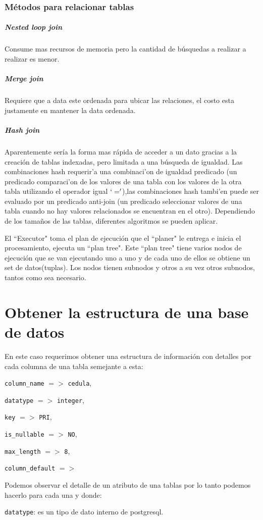 \subsubsection{M\'etodos para relacionar tablas}
\subparagraph{Nested loop join}
Consume mas recursos de memoria pero la cantidad de b\'usquedas a realizar a realizar es menor.\\
\subparagraph{Merge join}
Requiere que a data este ordenada para ubicar las relaciones, el costo esta justamente en mantener la data ordenada.
\subparagraph{Hash join}
Aparentemente ser\'ia la forma mas r\'apida de acceder a un dato gracias a la creaci\'on de tablas indexadas, pero limitada a una b\'usqueda de igualdad. Las combinaciones hash requerir'a una combinaci'on de igualdad predicado (un predicado comparaci'on de los valores de una tabla con los valores de la otra tabla utilizando el operador igual $`='$),las combinaciones hash tambi'en puede ser evaluado por un predicado anti-join (un predicado seleccionar valores de una tabla cuando no hay valores relacionados se encuentran en el otro). Dependiendo de los tama\~nos de las tablas, diferentes algoritmos se pueden aplicar.

El ``Executor" toma el plan de ejecuci\'on que el ``planer" le entrega e inicia el procesamiento, ejecuta un ``plan tree".
Este ``plan tree" tiene varios nodos de ejecuci\'on que se van ejecutando uno a uno y de cada uno de ellos se obtiene un set de datos(tuplas). Los nodos tienen subnodos y otros a su vez otros subnodos, tantos como sea necesario.
\section{Obtener la estructura de una base de datos}
En este caso requerimos obtener una estructura de informaci\'on con detalles por cada columna de una tabla semejante a esta:

\texttt{column\_name} $=>$ \texttt{cedula},
 
\texttt{datatype} $=>$ \texttt{integer}, 

\texttt{key} $=>$ \texttt{PRI},

\texttt{is\_nullable} $=>$ \texttt{NO},

\texttt{max\_length} $=>$ \texttt{8}, 

\texttt{column\_default} $=>$

Podemos observar el detalle de un atributo de una tablas por lo tanto podemos hacerlo para cada una y donde:

\texttt{datatype}: es un tipo de dato interno de postgresql.


